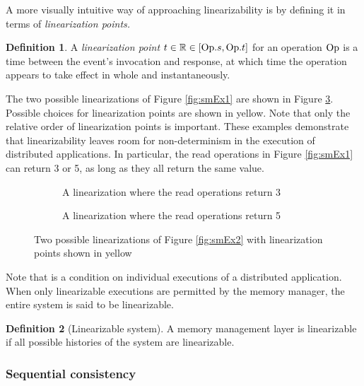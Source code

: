 \documentclass[]             %
{NASA}                       %
\theoremstyle{definition}
\newtheorem{definition}{Definition}[section]
\begin{document}
A more visually intuitive way of approaching linearizability is by
defining it in terms of \emph{linearization points.}

\begin{definition}
  A \emph{linearization point} $t \in \mathbb{R} \in [\mathrm{Op}.s, \mathrm{Op}.t]$
  for an operation $\mathrm{Op}$ is a time between the event's invocation and
  response, at which time the operation appears to take effect in
  whole and instantaneously.
\end{definition}

The two possible linearizations of Figure \ref{fig:smEx1} are shown in
Figure \ref{fig:smEx3}. Possible choices for linearization points are
shown in yellow. Note that only the relative order of linearization
points is important. These examples demonstrate that linearizability
leaves room for non-determinism in the execution of distributed
applications. In particular, the read operations in Figure
\ref{fig:smEx1} can return 3 or 5, as long as they all return the same
value.

\begin{figure}[p]
  \begin{subfigure}{1\textwidth}
    \centering
    
    \caption{A linearization where the read operations return 3}
    \label{fig:smEx1L1}
  \end{subfigure}
  \begin{subfigure}{1\textwidth}
    
        \caption{A linearization where the read operations return 5}
    \label{fig:smEx3L2}
  \end{subfigure}
  \caption{Two possible linearizations of Figure \ref{fig:smEx2} with linearization points shown in yellow}
  \label{fig:smEx3}
\end{figure}

Note that is a condition on individual executions of a distributed
application. When only linearizable executions are permitted by the
memory manager, the entire system is said to be linearizable.

\begin{definition}[Linearizable system]
  A memory management layer is linearizable if all possible histories
  of the system are linearizable.
\end{definition}

\subsubsection{Sequential consistency}
\label{sequential-consistency}
\end{document}

